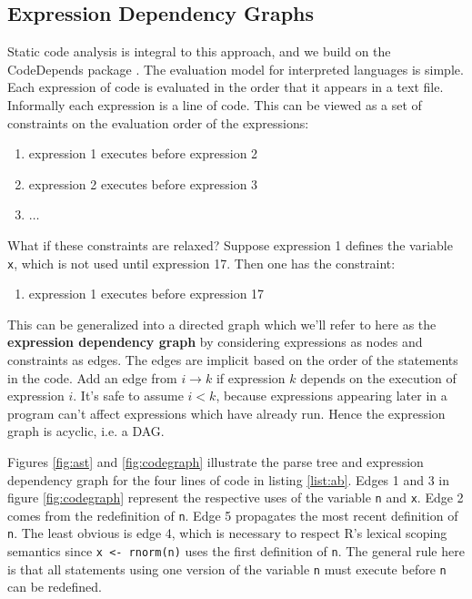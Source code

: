 \documentclass[12pt]{article}
\begin{document}
\subsection{Expression Dependency Graphs}

Static code analysis is integral to this approach, and we build on the 
CodeDepends package \cite{R-CodeDepends}.
The evaluation model for interpreted languages is simple. Each
expression of code is evaluated in the order that it appears in a text file. Informally
each expression is a line of code. This can be
viewed as a set of constraints on the evaluation order of the expressions:

\begin{enumerate}
    \item expression 1 executes before expression 2
    \item expression 2 executes before expression 3
    \item $\dots$
\end{enumerate}
What if these constraints are relaxed? Suppose expression 1 defines the variable
\texttt{x}, which is not used until expression 17. Then one has the
constraint:
\begin{enumerate}
    \item expression 1 executes before expression 17
\end{enumerate}
This can be generalized into a directed graph which we'll refer to here as
the \textbf{expression dependency graph} by considering expressions as
nodes and constraints as edges. The edges are implicit based on the order
of the statements in the code. Add an edge from $i \rightarrow k$ if
expression $k$ depends on the execution of expression $i$.  It's safe to
assume $i < k$, because expressions appearing later in a program can't
affect expressions which have already run. Hence the expression graph is
acyclic, i.e. a DAG.

Figures \ref{fig:ast} and \ref{fig:codegraph} illustrate the 
parse tree and expression dependency graph for the four lines of code in
listing \ref{list:ab}.  Edges 1 and 3 in figure \ref{fig:codegraph} represent the
respective uses of the variable \texttt{n} and \texttt{x}.  Edge 2 comes
from the redefinition of \texttt{n}.  Edge 5 propagates the most recent
definition of \texttt{n}.  The least obvious is edge 4, which is necessary
to respect R's lexical scoping semantics since \texttt{x <- rnorm(n)} uses
the first definition of \texttt{n}. The general rule here is that all
statements using one version of the variable \texttt{n} must execute before \texttt{n}
can be redefined.
\end{document}
